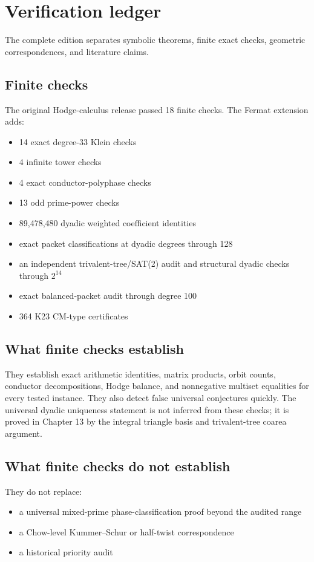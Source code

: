 \documentclass[11pt,oneside]{book}
\theoremstyle{definition}
\theoremstyle{remark}
\begin{document}
\chapter{Verification ledger}
The complete edition separates symbolic theorems, finite exact checks, geometric correspondences, and literature claims.

\section{Finite checks}
The original Hodge-calculus release passed 18 finite checks. The Fermat extension adds:
\begin{itemize}
\item 14 exact degree-33 Klein checks
\item 4 infinite tower checks
\item 4 exact conductor-polyphase checks
\item 13 odd prime-power checks
\item 89,478,480 dyadic weighted coefficient identities
\item exact packet classifications at dyadic degrees through 128
\item an independent trivalent-tree/SAT(2) audit and structural dyadic checks through $2^{14}$
\item exact balanced-packet audit through degree 100
\item 364 K23 CM-type certificates
\end{itemize}

\section{What finite checks establish}
They establish exact arithmetic identities, matrix products, orbit counts, conductor decompositions, Hodge balance, and nonnegative multiset equalities for every tested instance. They also detect false universal conjectures quickly. The universal dyadic uniqueness statement is not inferred from these checks; it is proved in Chapter 13 by the integral triangle basis and trivalent-tree coarea argument.

\section{What finite checks do not establish}
They do not replace:
\begin{itemize}
\item a universal mixed-prime phase-classification proof beyond the audited range
\item a Chow-level Kummer--Schur or half-twist correspondence
\item a historical priority audit
\end{itemize}
\end{document}
